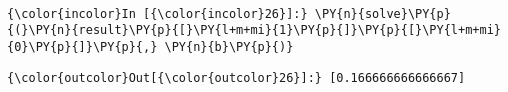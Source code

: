     \begin{center}
    \end{center}
    { \hspace*{\fill} \\}
    
    \begin{Verbatim}[commandchars=\\\{\}]
{\color{incolor}In [{\color{incolor}26}]:} \PY{n}{solve}\PY{p}{(}\PY{n}{result}\PY{p}{[}\PY{l+m+mi}{1}\PY{p}{]}\PY{p}{[}\PY{l+m+mi}{0}\PY{p}{]}\PY{p}{,} \PY{n}{b}\PY{p}{)}
\end{Verbatim}

            \begin{Verbatim}[commandchars=\\\{\}]
{\color{outcolor}Out[{\color{outcolor}26}]:} [0.166666666666667]
\end{Verbatim}
        

